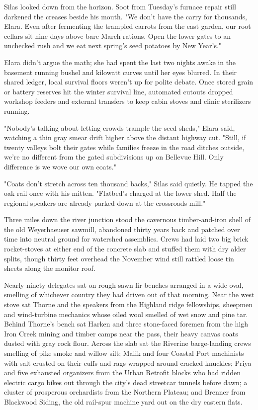 Silas looked down from the horizon. Soot from Tuesday's furnace repair still darkened the creases beside his mouth. "We don't have the carry for thousands, Elara. Even after fermenting the trampled carrots from the east garden, our root cellars sit nine days above bare March rations. Open the lower gates to an unchecked rush and we eat next spring's seed potatoes by New Year's."

Elara didn't argue the math; she had spent the last two nights awake in the basement running bushel and kilowatt curves until her eyes blurred. In their shared ledger, local survival floors weren't up for polite debate. Once stored grain or battery reserves hit the winter survival line, automated cutouts dropped workshop feeders and external transfers to keep cabin stoves and clinic sterilizers running.

"Nobody's talking about letting crowds trample the seed sheds," Elara said, watching a thin gray smear drift higher above the distant highway cut. "Still, if twenty valleys bolt their gates while families freeze in the road ditches outside, we're no different from the gated subdivisions up on Bellevue Hill. Only difference is we wove our own coats."

"Coats don't stretch across ten thousand backs," Silas said quietly. He tapped the oak rail once with his mitten. "Flatbed's charged at the lower shed. Half the regional speakers are already parked down at the crossroads mill."

\bigskip

Three miles down the river junction stood the cavernous timber-and-iron shell of the old Weyerhaeuser sawmill, abandoned thirty years back and patched over time into neutral ground for watershed assemblies. Crews had laid two big brick rocket-stoves at either end of the concrete slab and stuffed them with dry alder splits, though thirty feet overhead the November wind still rattled loose tin sheets along the monitor roof.

Nearly ninety delegates sat on rough-sawn fir benches arranged in a wide oval, smelling of whichever country they had driven out of that morning. Near the west stove sat Thorne and the speakers from the Highland ridge fellowships, sheepmen and wind-turbine mechanics whose oiled wool smelled of wet snow and pine tar. Behind Thorne's bench sat Harken and three stone-faced foremen from the high Iron Creek mining and timber camps near the pass, their heavy canvas coats dusted with gray rock flour. Across the slab sat the Riverine barge-landing crews smelling of pike smoke and willow silt; Malik and four Coastal Port machinists with salt crusted on their cuffs and rags wrapped around cracked knuckles; Priya and five exhausted organizers from the Urban Retrofit blocks who had ridden electric cargo bikes out through the city's dead streetcar tunnels before dawn; a cluster of prosperous orchardists from the Northern Plateau; and Brenner from Blackwood Siding, the old rail-spur machine yard out on the dry eastern flats.

